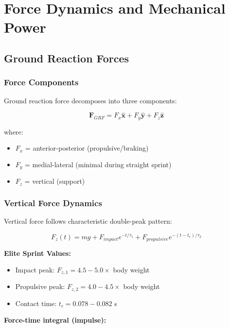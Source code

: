 \section{Force Dynamics and Mechanical Power}

\subsection{Ground Reaction Forces}

\subsubsection{Force Components}

Ground reaction force decomposes into three components:

\begin{equation}
\mathbf{F}_{GRF} = F_x \mathbf{\hat{x}} + F_y \mathbf{\hat{y}} + F_z \mathbf{\hat{z}}
\label{eq:grf_components}
\end{equation}

where:
\begin{itemize}
\item $F_x$ = anterior-posterior (propulsive/braking)
\item $F_y$ = medial-lateral (minimal during straight sprint)
\item $F_z$ = vertical (support)
\end{itemize}

\subsubsection{Vertical Force Dynamics}

Vertical force follows characteristic double-peak pattern:

\begin{equation}
F_z(t) = mg + F_{impact} e^{-t/\tau_1} + F_{propulsive} e^{-(t-t_c)/\tau_2}
\label{eq:vertical_force}
\end{equation}

\textbf{Elite Sprint Values:}
\begin{itemize}
\item Impact peak: $F_{z,1} = 4.5-5.0 \times$ body weight
\item Propulsive peak: $F_{z,2} = 4.0-4.5 \times$ body weight
\item Contact time: $t_c = 0.078-0.082$ s
\end{itemize}

\textbf{Force-time integral (impulse):}


